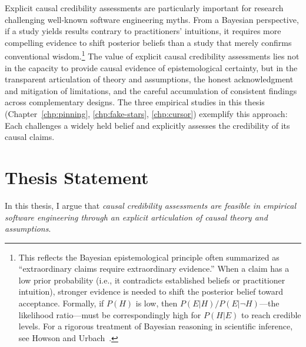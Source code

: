 Explicit causal credibility assessments are particularly important for research challenging well-known software engineering myths.
From a Bayesian perspective, if a study yields results contrary to practitioners' intuitions, it requires more compelling evidence to shift posterior beliefs than a study that merely confirms conventional wisdom.\footnote{This reflects the Bayesian epistemological principle often summarized as ``extraordinary claims require extraordinary evidence.'' When a claim has a low prior probability (i.e., it contradicts established beliefs or practitioner intuition), stronger evidence is needed to shift the posterior belief toward acceptance. Formally, if $P(H)$ is low, then $P(E|H)/P(E|\neg H)$---the likelihood ratio---must be correspondingly high for $P(H|E)$ to reach credible levels. For a rigorous treatment of Bayesian reasoning in scientific inference, see Howson and Urbach~\cite{howson2006scientific}.}
The value of explicit causal credibility assessments lies not in the capacity to provide causal evidence of epistemological certainty, but in the transparent articulation of theory and assumptions, the honest acknowledgment and mitigation of limitations, and the careful accumulation of consistent findings across complementary designs.
The three empirical studies in this thesis (Chapter~\ref{chp:pinning}, \ref{chp:fake-stars}, \ref{chp:cursor}) exemplify this approach: Each challenges a widely held belief and explicitly assesses the credibility of its causal claims.

\section{Thesis Statement}
\label{sec:thesis-statement}

\begin{framed}
In this thesis, I argue that \emph{causal credibility assessments are feasible in empirical software engineering through an explicit articulation of causal theory and assumptions}.
\end{framed}

